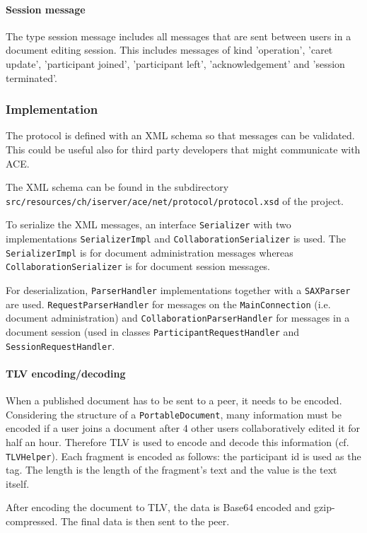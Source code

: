 \paragraph{Session message}
The type session message includes all messages that are sent between users in a document editing session. This includes messages of kind 'operation', 'caret update', 'participant joined', 'participant left', 'acknowledgement' and 'session terminated'.


\subsubsection{Implementation}
The protocol is defined with an XML schema so that messages can be validated. This could be useful also for third party developers that might communicate with ACE.

The XML schema can be found in the subdirectory \texttt{src/resources/ch/iserver/ace/net/protocol/protocol.xsd} of the project.

To serialize the XML messages, an interface \texttt{Serializer} with two implementations \texttt{SerializerImpl} and \texttt{CollaborationSerializer} is used. The \texttt{SerializerImpl} is for document administration messages whereas \texttt{CollaborationSerializer} is for document session messages.

For deserialization, \texttt{ParserHandler} implementations together with a \texttt{SAXParser} are used. \texttt{RequestParserHandler} for messages on the \texttt{MainConnection} (i.e. document administration) and \texttt{CollaborationParserHandler} for messages in a document session (used in classes \texttt{ParticipantRequestHandler} and \texttt{SessionRequestHandler}.


\paragraph{TLV encoding/decoding}
When a published document has to be sent to a peer, it needs to be encoded. Considering the structure of a \texttt{PortableDocument}, many information must be encoded if a user joins a document after 4 other users collaboratively edited it for half an hour. Therefore TLV is used to encode and decode this information (cf. \texttt{TLVHelper}). Each fragment is encoded as follows: the participant id is used as the tag. The length is the length of the fragment's text and the value is the text itself. 

After encoding the document to TLV, the data is Base64 encoded and gzip-compressed. The final data is then sent to the peer.


